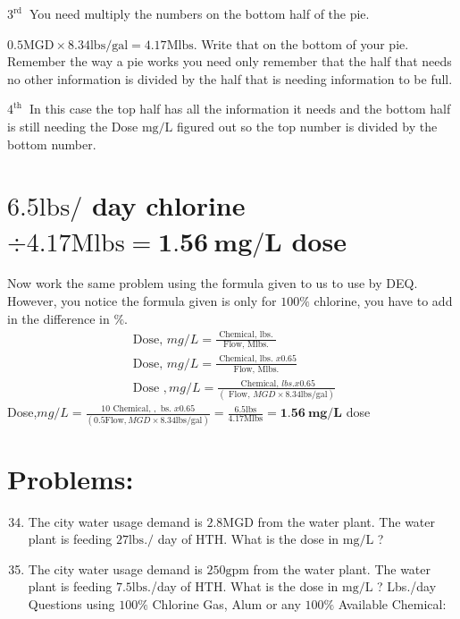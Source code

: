\begin{enumerate}
$3^{\text {rd }}$ You need multiply the numbers on the bottom half of the pie.

$0.5 \mathrm{MGD} \times 8.34 \mathrm{lbs} / \mathrm{gal}=4.17 \mathrm{Mlbs}$. Write that on the bottom of your pie. Remember the way a pie works you need only remember that the half that needs no other information is divided by the half that is needing information to be full.

$4^{\text {th }}$ In this case the top half has all the information it needs and the bottom half is still needing the Dose $\mathrm{mg} / \mathrm{L}$ figured out so the top number is divided by the bottom number.

\section{$6.5 \mathrm{lbs} /$ day chlorine $\div 4.17 \mathrm{Mlbs}=\mathbf{1 . 5 6} \mathbf{~ m g} / \mathbf{L}$ dose}
Now work the same problem using the formula given to us to use by DEQ. However, you notice the formula given is only for $100 \%$ chlorine, you have to add in the difference in $\%$.
$$
\begin{gathered}
\text { Dose, } m g / L=\frac{\text { Chemical, lbs. }}{\text { Flow, Mlbs. }} \\
\text { Dose, } m g / L=\frac{\text { Chemical, lbs. } x 0.65}{\text { Flow, Mlbs. }} \\
\text { Dose }, m g / L=\frac{\text { Chemical, } l b s . x 0.65}{(\text { Flow, } M G D \times 8.34 \mathrm{lbs} / \mathrm{gal})}
\end{gathered}
$$
Dose,$m g / L=\frac{10 \text { Chemical, }, \text { bs. } x 0.65}{(0.5 \mathrm{Flow}, M G D \times 8.34 \mathrm{lbs} / \mathrm{gal})}=\frac{6.5 \mathrm{lbs}}{4.17 \mathrm{Mlbs}}=\mathbf{1 . 5 6} \mathbf{~ m g} / \mathbf{L}$ dose

\section{Problems:}
\begin{enumerate}
  \setcounter{enumi}{33}
  \item The city water usage demand is $2.8 \mathrm{MGD}$ from the water plant. The water plant is feeding $27 \mathrm{lbs} . /$ day of $\mathrm{HTH}$. What is the dose in $\mathrm{mg} / \mathrm{L}$ ?

  \item The city water usage demand is $250 \mathrm{gpm}$ from the water plant. The water plant is feeding $7.5 \mathrm{lbs}$./day of $\mathrm{HTH}$. What is the dose in $\mathrm{mg} / \mathrm{L}$ ? Lbs./day Questions using $100 \%$ Chlorine Gas, Alum or any $100 \%$ Available Chemical:\\


\end{enumerate}
\end{enumerate}
